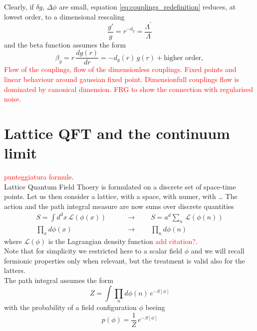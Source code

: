 Clearly, if $\delta g$, $\Delta \phi$ are small, equation \eqref{eq:couplings_redefinition} reduces, at lowest order, to a dimensional rescaling
\begin{equation*}
    \frac{g'}{g} = r^{-d_g} = \frac{\Lambda^\prime}{\Lambda}
\end{equation*} 
and the beta function assumes the form
\begin{equation*}
    \beta_g =  r \, \frac{dg(r)}{dr} = -d_g(r) \, g(r) + \text{higher order},
\end{equation*}
\textcolor{red}{Flow of the couplings, flow of the dimensionless couplings. Fixed points and linear behaviour around gaussian fixed point. Dimensionfull couplings flow is dominated by canonical dimension. FRG to show the connection with regularised noise.}


\section{Lattice QFT and the continuum limit}
\label{sec:lattice_continuum_}
\textcolor{red}{punteggiatura formule}. \\
Lattice Quantum Field Thoery is formulated on a discrete set of space-time points. Let us then consider a lattice, with a space, with numer, with \dots 
The action and the path integral measure are now sums over discrete quantities 
\begin{equation*}
    \begin{aligned}
	    S = \int d^dx \, \mathcal{L}(\phi(x)) \qquad &\to \qquad S = a^d \sum_n \, \mathcal{L}(\phi(n)) \\
        \prod_{x} d\phi(x) \qquad &\to  \qquad \prod_n d\phi(n)
    \end{aligned}
\end{equation*}
where $\mathcal{L}(\phi)$ is the Lagrangian density function \textcolor{red}{add citation?}.  \\
Note that for simplicity we restricted here to a scalar field $\phi$ and we will recall fermionic properties only when relevant, but the treatment is valid also for the latters. \\ 
The path integral assumes the form 
\begin{equation*}
    Z = \int \prod_n d\phi(n) \, e^{-S[\phi]}
\end{equation*}
with the probability of a field configuration $\phi$ beeing 
\begin{equation}
    p(\phi) = \frac{1}{Z} \, e^{-S[\phi]}
    \label{eq:probability_distribution_lattice}
\end{equation}
